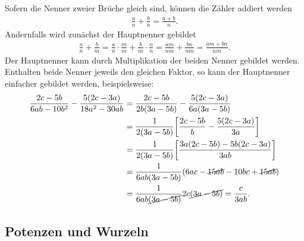 Sofern die Nenner zweier Brüche gleich sind, können die Zähler addiert werden 
\begin{align}
    \frac{a}{n}+\frac{b}{n} = \frac{a+b}{n}.
\end{align}
Andernfalls wird zunächst der Hauptnenner gebildet 
\begin{align}
    \frac{a}{n}+\frac{b}{m} = \frac{a}{n} \cdot \frac{m}{m} + \frac{b}{m}\cdot \frac{n}{n} = \frac{am}{nm} + \frac{bn}{nm} = \frac{am + bn}{nm}.
\end{align}
Der Hauptnenner kann durch Multiplikation der beiden Nenner gebildet werden. Enthalten beide Nenner jeweils den gleichen Faktor, so kann der Hauptnenner einfacher gebildet werden, beispielsweise: 
\begin{align}
    \frac{2c-5b}{6ab - 10b^2} - \frac{5(2c-3a)}{18a^2 -30ab} &= \frac{2c-5b}{2b(3a-5b)} - \frac{5(2c-3a)}{6a(3a-5b)} \notag \\
    &= \frac{1}{2(3a-5b)} \qty[\frac{2c-5b}{b}-\frac{5(2c-3a)}{3a}] \notag \\
    &= \frac{1}{2(3a-5b)} \qty[\frac{3a(2c-5b) -5b(2c-3a)}{3ab}] \notag \\
    &= \frac{1}{6ab(3a-5b)}\qty(6ac -\cancel{15ab} -10bc +\cancel{15ab}) \notag \\
    &= \frac{1}{6ab\cancel{(3a-5b)}} 2c\cancel{(3a-5b)} = \frac{c}{3ab}. 
\end{align}

\subsection{Potenzen und Wurzeln}

